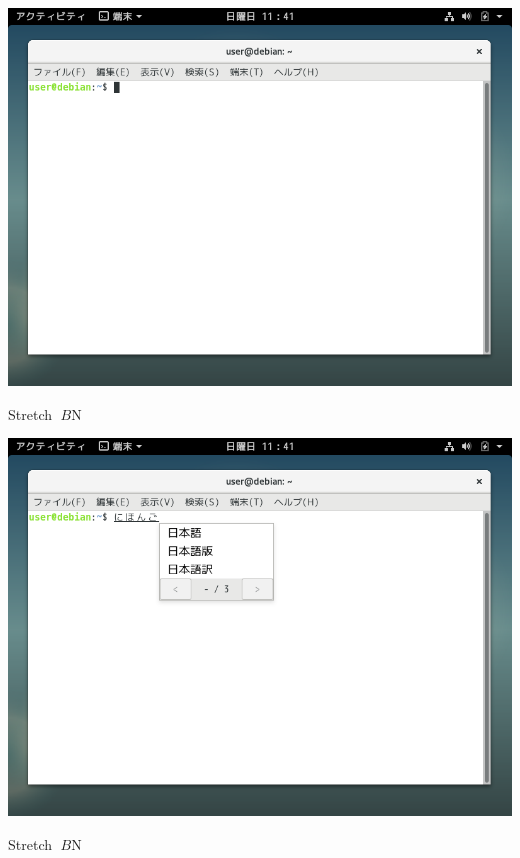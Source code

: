 \documentclass[mingoth,a4paper]{jsarticle}
\begin{document}
{{{{{{{{{{{{{{{{\begin{center}
\includegraphics[keepaspectratio,width=1\hsize]{image201907/stretch_gnome_2.png}
\end{center}



Stretch $B$N%

\begin{center}
\includegraphics[keepaspectratio,width=1\hsize]{image201907/stretch_gnome_3.png}
\end{center}



Stretch $B$N%

}}}}}}}}}}}}}}}}
\end{document}
